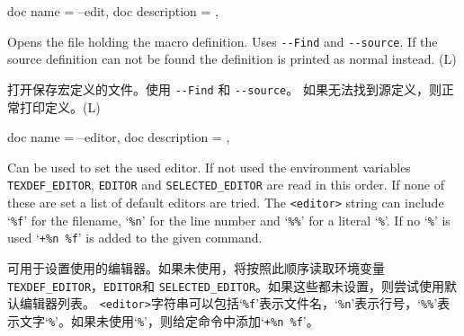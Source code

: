 \begin{docKeys}[
    doc no index,   %
    doc parameter = {~},
    ]
    {
    {
        doc name        = --edit,
        doc description = ,
    }
    }
    
    Opens the file holding the macro definition. Uses \verb|--Find| and \verb|--source|.
    If the source definition can not be found the definition is printed as normal instead. (L)
    
    打开保存宏定义的文件。使用 \verb|--Find| 和 \verb|--source|。 如果无法找到源定义，则正常打印定义。(L)

\end{docKeys}

\begin{docKeys}[
    doc no index,   %
    doc parameter = {~\meta{editor}},
    ]
    {
    {
        doc name        = --editor,
        doc description = ,
    }
    }
    
Can be used to set the used editor. If not used the environment variables \verb|TEXDEF_EDITOR|, \verb|EDITOR| and
\verb|SELECTED_EDITOR| are read in this order. If none of these are set a list of default
editors are tried.  The \verb|<editor>| string can include `\verb|%f|' for the filename, `\verb|%n|' for
the line number and `\verb|%%|' for a literal `\verb|%|'.  If no `\verb|%|' is used `\verb|+%n %f|' is added to
the given command.

可用于设置使用的编辑器。如果未使用，将按照此顺序读取环境变量\verb|TEXDEF_EDITOR|，\verb|EDITOR|和 \verb|SELECTED_EDITOR|。如果这些都未设置，则尝试使用默认编辑器列表。 \verb|<editor>|字符串可以包括`\verb|%f|'表示文件名，`\verb|%n|'表示行号，`\verb|%%|'表示文字`\verb|%|'。如果未使用`\verb|%|'，则给定命令中添加`\verb|+%n %f|'。

\end{docKeys}
    
     